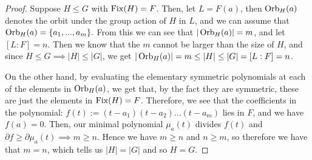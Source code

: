 \begin{proof}
    Suppose $H\leq G$ with $\operatorname{Fix}(H)=F$. Then, let $L = F(a)$, then $\operatorname{Orb}_H(a)$ denotes the orbit under the group action of $H$ in $L$, and we can assume that $\operatorname{Orb}_H(a) = \{a_1,...,a_m\}.$ From this we can see that $|\operatorname{Orb}_H(a)| = m$, and let $[L:F]=n$.
    Then we know that the $m$ cannot be larger than the size of $H$, and since $H\leq G \implies |H|\leq|G|$, we get $|\operatorname{Orb}_H(a)| = m \leq |H| \leq |G| = [L:F] = n$.
    
   
    On the other hand, by evaluating the elementary symmetric polynomials at each of the elements in $\operatorname{Orb}_H(a)$, we get that, by the fact they are symmetric, these are just the elements in $\operatorname{Fix}(H)=F$. Therefore, we see that the coefficients in the polynomial: $f(t) := (t-a_1)(t-a_2)...(t-a_m)$ lies in $F$, and we have $f(a)=0$. Then, our minimal polynomial $\mu_a(t)$ divides $f(t)$ and $\partial f \geq \partial \mu_a(t) \implies m \geq n$. Hence we have $m \geq n$ and $n \geq m$, so therefore we have that $m=n$, which tells us $|H|=|G|$ and so $H=G.$
\end{proof}



